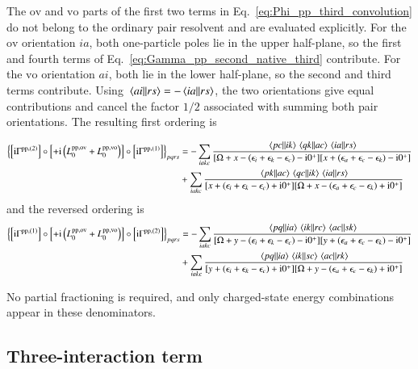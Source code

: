 \documentclass[aip,jcp,reprint,noshowkeys,superscriptaddress]{revtex4-1}
\newcommand{\eps}{\epsilon}
\newcommand{\ii}{\mathrm{i}}
\newcommand{\pp}{\text{pp}}
\begin{document}
The $\text{ov}$ and $\text{vo}$ parts of the first two terms in
Eq.~\eqref{eq:Phi_pp_third_convolution} do not belong to the ordinary pair
resolvent and are evaluated explicitly.
For the $\text{ov}$ orientation $ia$, both one-particle poles lie in the upper
half-plane, so the first and fourth terms of
Eq.~\eqref{eq:Gamma_pp_second_native_third} contribute.
For the $\text{vo}$ orientation $ai$, both lie in the lower half-plane, so the
second and third terms contribute.
Using $\mel{ai}{}{rs}=-\mel{ia}{}{rs}$, the two orientations give equal
contributions and cancel the factor $1/2$ associated with summing both pair orientations.
The resulting first ordering is
\begin{widetext}
\begin{equation}
\begin{split}
\left\{
\left[\ii\Gamma^{\pp,(2)}\right]
\circ\left[+\ii\left(L_0^{\pp,\text{ov}}+L_0^{\pp,\text{vo}}\right)\right]
\circ\left[\ii\Gamma^{\pp,(1)}\right]
\right\}_{pqrs}
&=
-
\sum_{iakc}
\frac{
\mel{pc}{}{ik}\mel{qk}{}{ac}\mel{ia}{}{rs}
}
{[\Omega+x-(\eps_i+\eps_k-\eps_c)-\ii0^+]
 [x+(\eps_a+\eps_c-\eps_k)-\ii0^+]}
\\
&+
\sum_{iakc}
\frac{
\mel{pk}{}{ac}\mel{qc}{}{ik}\mel{ia}{}{rs}
}
{[x+(\eps_i+\eps_k-\eps_c)+\ii0^+]
 [\Omega+x-(\eps_a+\eps_c-\eps_k)+\ii0^+]}
\end{split}
\label{eq:Phi_pp_third_mixed_left}
\end{equation}
and the reversed ordering is
\begin{equation}
\begin{split}
\left\{
\left[\ii\Gamma^{\pp,(1)}\right]
\circ\left[+\ii\left(L_0^{\pp,\text{ov}}+L_0^{\pp,\text{vo}}\right)\right]
\circ\left[\ii\Gamma^{\pp,(2)}\right]
\right\}_{pqrs}
&=
-
\sum_{iakc}
\frac{
\mel{pq}{}{ia}\mel{ik}{}{rc}\mel{ac}{}{sk}
}
{[\Omega+y-(\eps_i+\eps_k-\eps_c)-\ii0^+]
 [y+(\eps_a+\eps_c-\eps_k)-\ii0^+]}
\\
&+
\sum_{iakc}
\frac{
\mel{pq}{}{ia}\mel{ik}{}{sc}\mel{ac}{}{rk}
}
{[y+(\eps_i+\eps_k-\eps_c)+\ii0^+]
 [\Omega+y-(\eps_a+\eps_c-\eps_k)+\ii0^+]}
\end{split}
\label{eq:Phi_pp_third_mixed_right}
\end{equation}
\end{widetext}
No partial fractioning is required, and only charged-state energy combinations
appear in these denominators.

\subsection{Three-interaction term}
\end{document}
